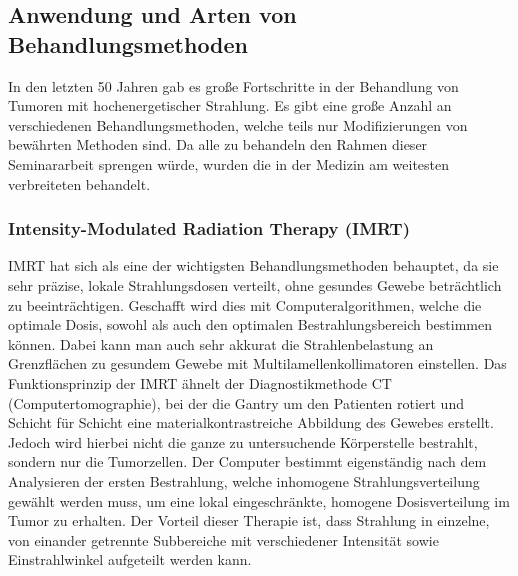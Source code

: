 


\subsection{Anwendung und Arten von Behandlungsmethoden}
In den letzten 50 Jahren gab es große Fortschritte in der Behandlung von Tumoren mit hochenergetischer Strahlung.
Es gibt eine große Anzahl an verschiedenen Behandlungsmethoden, welche teils nur Modifizierungen von bewährten Methoden sind.
Da alle zu behandeln den Rahmen dieser Seminararbeit sprengen würde, wurden die in der Medizin am weitesten verbreiteten behandelt.
\subsubsection{Intensity-Modulated Radiation Therapy (IMRT)}
IMRT hat sich als eine der wichtigsten Behandlungsmethoden behauptet, da sie sehr präzise, lokale Strahlungsdosen verteilt, ohne gesundes Gewebe beträchtlich zu beeinträchtigen.
Geschafft wird dies mit Computeralgorithmen, welche die optimale Dosis, sowohl als auch den optimalen Bestrahlungsbereich bestimmen können.
Dabei kann man auch sehr akkurat die Strahlenbelastung an Grenzflächen zu gesundem Gewebe mit Multilamellenkollimatoren einstellen.
Das Funktionsprinzip der IMRT ähnelt der Diagnostikmethode CT (Computertomographie), bei der die Gantry um den Patienten rotiert und Schicht für Schicht eine materialkontrastreiche Abbildung des Gewebes erstellt.
Jedoch wird hierbei nicht die ganze zu untersuchende Körperstelle bestrahlt, sondern nur die Tumorzellen.
Der Computer bestimmt eigenständig nach dem Analysieren der ersten Bestrahlung, welche inhomogene Strahlungsverteilung gewählt werden muss, um eine lokal eingeschränkte, homogene Dosisverteilung im Tumor zu erhalten. \cite{teh1999intensity}
Der Vorteil dieser Therapie ist, dass Strahlung in einzelne, von einander getrennte Subbereiche mit verschiedener Intensität sowie Einstrahlwinkel aufgeteilt werden kann.
